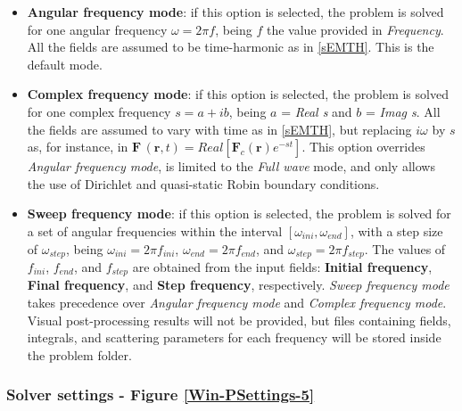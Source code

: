 \begin{itemize}\itemsep0.25em 
	\item \textbf{Angular frequency mode}: if this option is selected, the problem is solved for one angular frequency $\omega = 2 \pi f$, being $f$ the value provided in \textit{Frequency}. All the fields are assumed to be time-harmonic as in \ref{sEMTH}. This is the default mode. 
	\quad
	\item \textbf{Complex frequency mode}: if this option is selected, the problem is solved for one complex frequency $s = a + ib$, being $a$ = \textit{Real s} and $b$ = \textit{Imag s}. All the fields are assumed to vary with time as in \ref{sEMTH}, but replacing $i\omega$ by $s$ as, for instance, in $\mathbf{F}\,(\mathbf{r},t) = Real\left[\mathbf{F}_{c}(\mathbf{r})e^{-st}\right]$. This option overrides \emph{Angular frequency mode}, is limited to the \textit{Full wave} mode, and only allows the use of Dirichlet and quasi-static Robin boundary conditions.
	\quad
	\item \textbf{Sweep frequency mode}: if this option is selected, the problem is solved for a set of angular frequencies within the interval $[\omega_{ini}, \omega_{end}]$, with a step size of $\omega_{step}$, being $\omega_{ini} = 2 \pi f_{ini}$, $\omega_{end} = 2 \pi f_{end}$, and $\omega_{step} = 2 \pi f_{step}$. The values of $f_{ini}$, $f_{end}$, and $f_{step}$ are obtained from the input fields: \textbf{Initial frequency}, \textbf{Final frequency}, and \textbf{Step frequency}, respectively. \textit{Sweep frequency mode} takes precedence over \emph{Angular frequency mode} and \emph{Complex frequency mode}. Visual post-processing results will not be provided, but files containing fields, integrals, and scattering parameters for each frequency will be stored inside the problem folder.	
\end{itemize}

\subsubsection{Solver settings - Figure \ref{Win-PSettings-5}}\label{SolverSectionTab}


